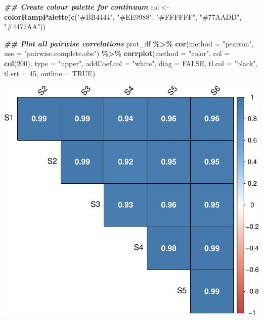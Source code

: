 \documentclass[9pt,a4paper,]{extarticle}
\newenvironment{Shaded}{\begin{snugshade}}{\end{snugshade}}
\newcommand{\AttributeTok}[1]{\textcolor[rgb]{0.13,0.29,0.53}{#1}}
\newcommand{\ConstantTok}[1]{\textcolor[rgb]{0.56,0.35,0.01}{#1}}
\newcommand{\DecValTok}[1]{\textcolor[rgb]{0.00,0.00,0.81}{#1}}
\newcommand{\DocumentationTok}[1]{\textcolor[rgb]{0.56,0.35,0.01}{\textbf{\textit{#1}}}}
\newcommand{\FunctionTok}[1]{\textcolor[rgb]{0.13,0.29,0.53}{\textbf{#1}}}
\newcommand{\NormalTok}[1]{#1}
\newcommand{\OtherTok}[1]{\textcolor[rgb]{0.56,0.35,0.01}{#1}}
\newcommand{\SpecialCharTok}[1]{\textcolor[rgb]{0.81,0.36,0.00}{\textbf{#1}}}
\newcommand{\StringTok}[1]{\textcolor[rgb]{0.31,0.60,0.02}{#1}}
\begin{document}
\begin{Shaded}
\begin{Highlighting}[]
\DocumentationTok{\#\# Create colour palette for continuum}
\NormalTok{col }\OtherTok{\textless{}{-}} \FunctionTok{colorRampPalette}\NormalTok{(}\FunctionTok{c}\NormalTok{(}\StringTok{"\#BB4444"}\NormalTok{, }\StringTok{"\#EE9988"}\NormalTok{, }\StringTok{"\#FFFFFF"}\NormalTok{,}
                          \StringTok{"\#77AADD"}\NormalTok{, }\StringTok{"\#4477AA"}\NormalTok{))}

\DocumentationTok{\#\# Plot all pairwise correlations}
\NormalTok{prot\_df }\SpecialCharTok{\%\textgreater{}\%}
  \FunctionTok{cor}\NormalTok{(}\AttributeTok{method =} \StringTok{"pearson"}\NormalTok{, }
      \AttributeTok{use =} \StringTok{"pairwise.complete.obs"}\NormalTok{) }\SpecialCharTok{\%\textgreater{}\%}
  \FunctionTok{corrplot}\NormalTok{(}\AttributeTok{method =} \StringTok{"color"}\NormalTok{,}
           \AttributeTok{col =} \FunctionTok{col}\NormalTok{(}\DecValTok{200}\NormalTok{), }
           \AttributeTok{type =} \StringTok{"upper"}\NormalTok{, }
           \AttributeTok{addCoef.col =} \StringTok{"white"}\NormalTok{,}
           \AttributeTok{diag =} \ConstantTok{FALSE}\NormalTok{, }
           \AttributeTok{tl.col =} \StringTok{"black"}\NormalTok{, }
           \AttributeTok{tl.srt =} \DecValTok{45}\NormalTok{, }
           \AttributeTok{outline =} \ConstantTok{TRUE}\NormalTok{)}
\end{Highlighting}
\end{Shaded}

\begin{center}\includegraphics[height=0.3\textheight]{workflow_expressions_files/figure-latex/correlation_plot_3-1} \end{center}
\end{document}

